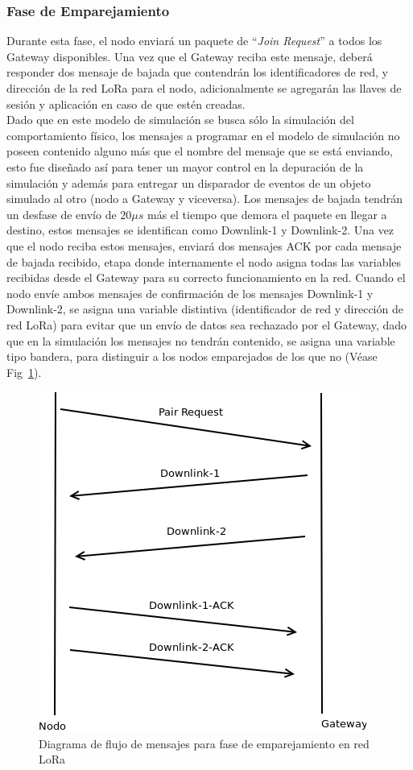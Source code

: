 \begin{justify}
\subsubsection{Fase de Emparejamiento}
Durante esta fase, el nodo enviará un paquete de ``\textit{Join Request}'' a todos los Gateway disponibles. Una vez que el Gateway reciba este mensaje, deberá responder dos mensaje de bajada que contendrán los identificadores de red, y dirección de la red LoRa para el nodo, adicionalmente se agregarán las llaves de sesión y aplicación en caso de que estén creadas.\\
 Dado que en este modelo de simulación se busca sólo la simulación del comportamiento físico, los mensajes a programar en el modelo de simulación no poseen contenido alguno más que el nombre del mensaje que se está enviando, esto fue diseñado así para tener un mayor control en la depuración de la simulación y además para entregar un disparador de eventos de un objeto simulado al otro (nodo a Gateway y viceversa).
Los mensajes de bajada tendrán un desfase de envío de $20\mu s$ más el tiempo que demora el paquete en llegar a destino, estos mensajes se identifican como Downlink-1 y Downlink-2. Una vez que el nodo reciba estos mensajes, enviará dos mensajes ACK por cada mensaje de bajada recibido, etapa donde internamente el nodo asigna todas las variables recibidas desde el Gateway para su correcto funcionamiento en la red.
Cuando el nodo envíe ambos mensajes de confirmación de los mensajes Downlink-1 y Downlink-2, se asigna una variable distintiva (identificador de red y dirección de red LoRa) para evitar que un envío de datos sea rechazado por el Gateway, dado que en la simulación los mensajes no tendrán contenido, se asigna una variable tipo bandera, para distinguir a los nodos emparejados de los que no (Véase Fig~\ref{pair:1}).~\cite{Sornin}
\begin{figure}[!ht]
\centering
\includegraphics[scale=0.5]{diagramas/pair}
\caption{Diagrama de flujo de mensajes para fase de emparejamiento en red LoRa}
\label{pair:1}
\end{figure}
\newpage
\noindent
\clearpage

\end{justify}
